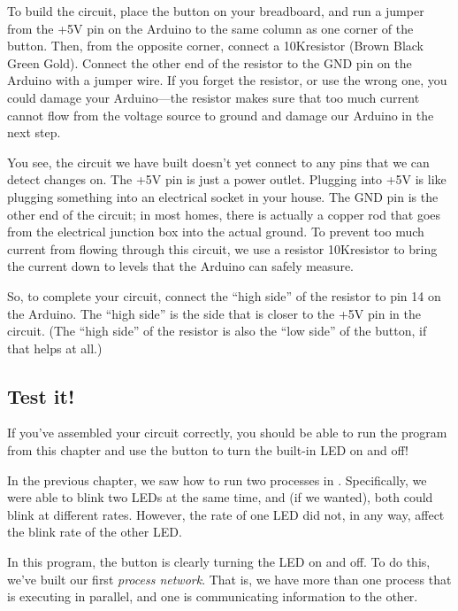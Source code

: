 To build the circuit, place the button on your breadboard, and run a jumper from the {\code +5V} pin on the Arduino to the same column as one corner of the button. Then, from the opposite corner, connect a 10K\ohm resistor (Brown Black Green Gold). Connect the other end of the resistor to the {\code GND} pin on the Arduino with a jumper wire. If you forget the resistor, or use the wrong one, you could damage your Arduino---the resistor makes sure that too much current cannot flow from the voltage source to ground and damage our Arduino in the next step.

You see, the circuit we have built doesn't yet connect to any pins that we can detect changes on. The {\code +5V} pin is just a power outlet. Plugging into {\code +5V} is like plugging something into an electrical socket in your house. The {\code GND} pin is the other end of the circuit; in most homes, there is actually a copper rod that goes from the electrical junction box into the actual ground. To prevent too much current from flowing through this circuit, we use a resistor 10K\ohm resistor to bring the current down to levels that the Arduino can safely measure.

So, to complete your circuit, connect the ``high side'' of the resistor to pin 14 on the Arduino. The ``high side'' is the side that is closer to the {\code +5V} pin in the circuit. (The ``high side'' of the resistor is also the ``low side'' of the button, if that helps at all.)

\subsection{Test it!}
If you've assembled your circuit correctly, you should be able to run the program from this chapter and use the button to turn the built-in LED on and off!

\PATTERNS
In the previous chapter, we saw how to run two processes in \PARallel. Specifically, we were able to blink two LEDs at the same time, and (if we wanted), both could blink at different rates. However, the rate of one LED did not, in any way, affect the blink rate of the other LED.

In this program, the button is clearly turning the LED on and off. To do this, we've built our first {\em process network}. That is, we have more than one process that is executing in parallel, and one is communicating information to the other.

